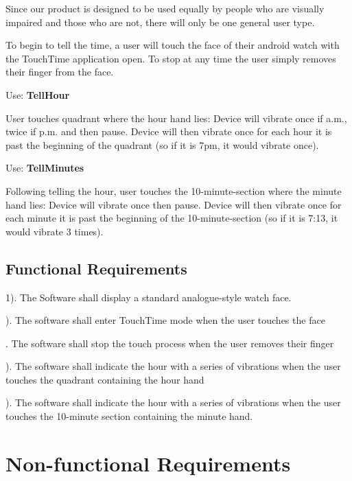 \documentclass[12pt, titlepage]{article}
\begin{document}
Since our product is designed to be used equally by people who are visually impaired and those who are not, there will only be one general user type.
\vspace{2mm}

To begin to tell the time, a user will touch the face of their android watch with the TouchTime application open. To stop at any time the user simply removes their finger from the face.
\vspace{2mm}

\noindent Use: \textbf{TellHour}

User touches quadrant where the hour hand lies:
	Device will vibrate once if a.m., twice if p.m. and then pause.
	Device will then vibrate once for each hour it is past the beginning of the quadrant (so if it is 7pm, it would vibrate once).
\vspace{2mm}

\noindent Use: \textbf{TellMinutes}

Following telling the hour, user touches the 10-minute-section where the minute hand lies:
	Device will vibrate once then pause.
	Device will then vibrate once for each minute it is past the beginning of the 10-minute-section (so if it is 7:13, it would vibrate 3 times).

\newpage
\subsection{Functional Requirements}

1). The Software shall display a standard analogue-style watch face.

). The software shall enter TouchTime mode when the user touches the face

. The software shall stop the touch process when the user removes their finger %

). The software shall indicate the hour with a series of vibrations when the user touches the quadrant containing the hour hand %

). The software shall indicate the hour with a series of vibrations when the user touches the 10-minute section containing the minute hand.

\section{Non-functional Requirements}
\end{document}
